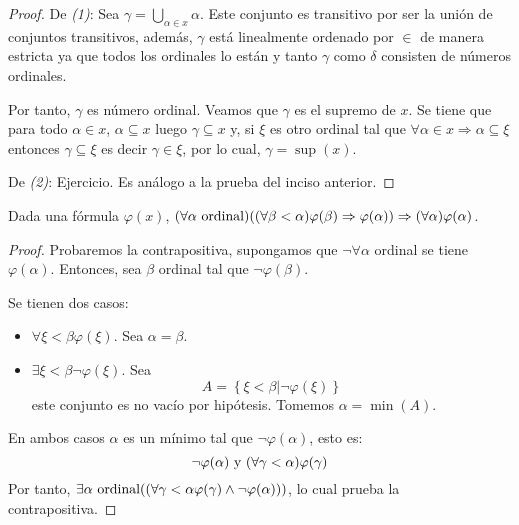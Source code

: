 \documentclass[12pt]{report}
\newcounter{it}
\theoremstyle{largebreak}
\begin{document}
    \begin{proof}
        De \textit{(1)}: Sea $\gamma=\bigcup_{\alpha\in x}\alpha$. Este conjunto es transitivo por ser la unión de conjuntos transitivos, además, $\gamma$ está linealmente ordenado por $\in$ de manera estricta ya que todos los ordinales lo están y tanto $\gamma$ como $\delta$ consisten de números ordinales.

        Por tanto, $\gamma$ es número ordinal. Veamos que $\gamma$ es el supremo de $x$. Se tiene que para todo $\alpha\in x$, $\alpha\subseteq x$ luego $\gamma\subseteq x$ y, si $\xi$ es otro ordinal tal que $\forall\alpha\in x\Rightarrow\alpha\subseteq\xi$ entonces $\gamma\subseteq\xi$ es decir $\gamma\in\xi$, por lo cual, $\gamma=\sup(x)$.

        De \textit{(2)}: Ejercicio. Es análogo a la prueba del inciso anterior.
    \end{proof}

    \begin{cor}
        Dada una fórmula $\varphi(x)$, $(\forall\alpha\textup{ ordinal})((\forall\beta<\alpha)\varphi(\beta)\Rightarrow\varphi(\alpha))\Rightarrow(\forall\alpha)\varphi(\alpha)$.
    \end{cor}

    \begin{proof}
        Probaremos la contrapositiva, supongamos que $\neg\forall\alpha$ ordinal se tiene $\varphi(\alpha)$. Entonces, sea $\beta$ ordinal tal que $\neg\varphi(\beta)$.
        
        Se tienen dos casos:
        \begin{itemize}
            \item $\forall\xi<\beta \varphi(\xi)$. Sea $\alpha=\beta$.
            \item $\exists\xi<\beta\neg\varphi(\xi)$. Sea
            \begin{equation*}
                A=\left\{\xi<\beta\Big|\neg\varphi(\xi) \right\}
            \end{equation*}
            este conjunto es no vacío por hipótesis. Tomemos $\alpha=\min(A)$.
        \end{itemize}
        En ambos casos $\alpha$ es un mínimo tal que $\neg\varphi(\alpha)$, esto es:
        \begin{equation*}
            \neg\varphi(\alpha)\textup{ y }(\forall\gamma<\alpha)\varphi(\gamma)
        \end{equation*}
        Por tanto, $\exists\alpha\textup{ ordinal}((\forall\gamma<\alpha\varphi(\gamma)\land\neg\varphi(\alpha)))$, lo cual prueba la contrapositiva.
    \end{proof}
\end{document}
